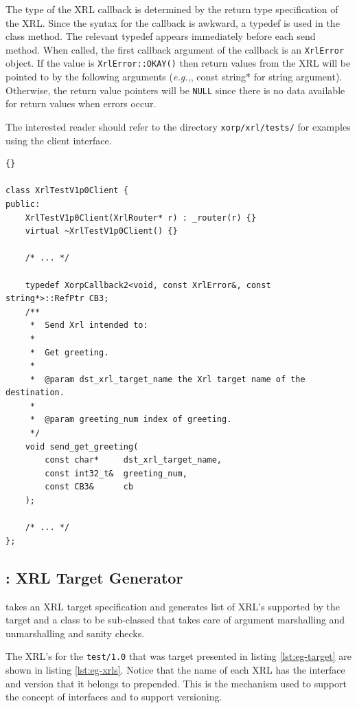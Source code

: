 \documentclass[11pt]{article}
\newcommand{\eg}{\emph{e.g.,}\xspace}
\begin{document}
The type of the XRL callback is determined by the return type
specification of the XRL.  Since the syntax for the callback is awkward,
a typedef is used in the class method.  The relevant typedef appears
immediately before each send method.  When called, the first callback
argument of the callback is an {\tt XrlError} object.  If the value is
{\tt XrlError::OKAY()} then return values from the XRL will be pointed
to by the following arguments (\eg, const string* for string argument).
Otherwise, the return value pointers will be {\tt NULL} since there is
no data available for return values when errors occur.

The interested reader should refer to the directory {\tt xorp/xrl/tests/}
for examples using the client interface.

\begin{lstlisting}[caption={ Fragment of a C++ XRL Client. %
                                     \label{lst:client-code} } ]{}

class XrlTestV1p0Client {
public:
    XrlTestV1p0Client(XrlRouter* r) : _router(r) {}
    virtual ~XrlTestV1p0Client() {}

    /* ... */

    typedef XorpCallback2<void, const XrlError&, const string*>::RefPtr CB3;
    /**
     *  Send Xrl intended to:
     *
     *  Get greeting.
     *
     *  @param dst_xrl_target_name the Xrl target name of the destination.
     *
     *  @param greeting_num index of greeting.
     */
    void send_get_greeting(
        const char*     dst_xrl_target_name,
        const int32_t&  greeting_num,
        const CB3&      cb
    );

    /* ... */
};
\end{lstlisting}

\subsection{\tgtgen : XRL Target Generator}

\tgtgen takes an XRL target specification and generates list of XRL's
supported by the target and a class to be sub-classed that takes care
of argument marshalling and unmarshalling and sanity checks.

The XRL's for the {\tt test/1.0} that was target presented in listing
\ref{lst:eg-target} are shown in listing \ref{lst:eg-xrls}.  Notice
that the name of each XRL has the interface and version that it
belongs to prepended.  This is the mechanism used to support the
concept of interfaces and to support versioning.
\end{document}
